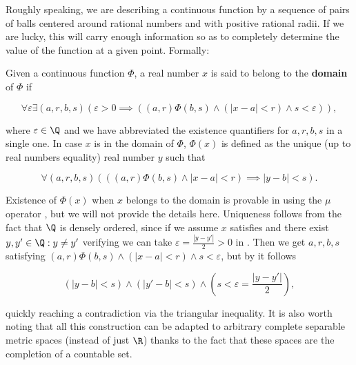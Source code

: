 \documentclass[../main.tex]{memoir}
\begin{document}
Roughly speaking, we are describing a continuous function by a sequence of pairs of balls centered around rational numbers and with positive rational radii. If we are lucky, this will carry enough information so as to completely determine the value of the function at a given point. Formally:

\begin{definition}
  Given a continuous function $\Phi$, a real number $x$ is said to belong to the \textbf{domain} of $\Phi$ if

  \begin{equation}
    \label{eq:continuity-at-point}
    \forall \varepsilon \exists (a, r, b, s) (\varepsilon > 0 \implies ((a, r)\Phi(b, s) \land (|x - a| < r) \land s < \varepsilon)),
  \end{equation}

  where $\varepsilon \in \Q$ and we have abbreviated the existence quantifiers for $a, r, b, s$ in a single one. In case $x$ is in the domain of $\Phi$, $\Phi(x)$ is defined as the unique (up to real numbers equality) real number $y$ such that

  \begin{equation}
    \label{eq:separable-image}
    \forall (a, r, b, s) (((a, r)\Phi(b, s) \land |x - a| < r) \implies |y - b| < s).
  \end{equation}
\end{definition}

\begin{remark}
  Existence of $\Phi(x)$ when $x$ belongs to the domain is provable in \rca using the $\mu$ operator \cite{simpson}, but we will not provide the details here. Uniqueness follows from the fact that $\Q$ is densely ordered, since if we assume $x$ satisfies  and there exist $y, y' \in \Q: y \neq y'$ verifying  we can take $\varepsilon = \frac{|y - y'|}{2} > 0$ in . Then we get $a, r, b, s$ satisfying $(a, r)\Phi(b, s) \land (|x - a| < r) \land s < \varepsilon$, but by  it follows

  \[ (|y - b| < s) \land (|y' - b| < s) \land (s < \varepsilon = \frac{|y - y'|}{2}), \]

  quickly reaching a contradiction via the triangular inequality. It is also worth noting that all this construction can be adapted to arbitrary complete separable metric spaces (instead of just $\R$) thanks to the fact that these spaces are the completion of a countable set.
\end{remark}
\end{document}
